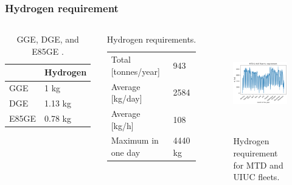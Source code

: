 \begin{frame}
\frametitle{Hydrogen requirement}
\begin{columns}
    \column[t]{5cm}
	\begin{table}[!htb]
		\centering
	    \caption{GGE, DGE, and E85GE \cite{doe_office_of_energy_efficiency_and_renewable_energy_hydrogen_2020} \cite{alternative_fuels_data_center_fuel_2014}.}
		\begin{tabular}{l|l}
		\hline
		                 & Hydrogen \\ \hline
		GGE              & 1 kg     \\
		DGE              & 1.13 kg  \\
		E85GE            & 0.78 kg  \\ \hline
        \end{tabular}
	\end{table}

	\begin{table}[!htb]
		\centering
	    \caption{Hydrogen requirements.}
		\begin{tabular}{l|l}
		\hline
		Total [tonnes/year]  & 943      \\
		Average [kg/day] 	 & 2584     \\
		Average [kg/h] 		 & 108      \\
		Maximum in one day   & 4440 kg  \\ \hline
        \end{tabular}
	\end{table}

	\column[t]{5cm}
	\begin{figure}[htbp!]
		\begin{center}
			\includegraphics[height=4.3cm]{images/hydro-fleet}
		\end{center}
		\caption{Hydrogen requirement for MTD and UIUC fleets.}
	\end{figure}

\end{columns}
\end{frame}


